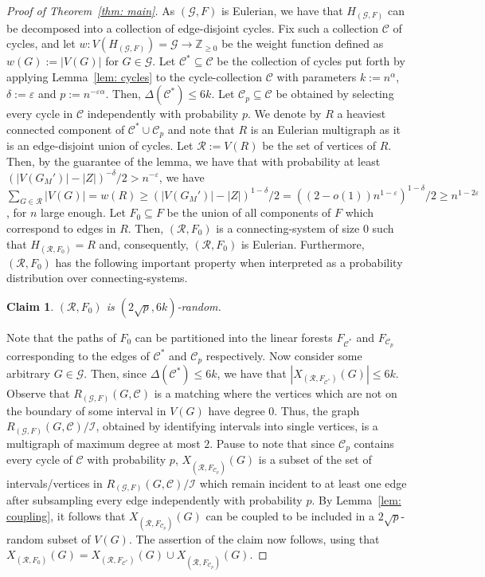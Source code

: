\documentclass[11pt,reqno]{article}
\newtheorem{claim}[theorem]{Claim}
\newenvironment{claimproof}[1][\proofname]{\proof[#1]\renewcommand{\qedsymbol}{$\blacksquare$}}{\endproof}
\begin{document}
\begin{proof}[Proof of Theorem~\ref{thm: main}]
  As $(\mathcal G,F)$ is Eulerian, we have that $H_{(\mathcal G,F)}$  can be decomposed into a collection of edge-disjoint cycles. Fix such a collection $\mathcal C$ of cycles, and let $w:V(H_{(\mathcal G,F)})=\mathcal{G}\rightarrow \mathbb{Z}_{\ge 0}$ be the weight function defined as $w(G):=|V(G)|$ for $G\in\mathcal G$. Let $\mathcal C^*\subseteq \mathcal C$ be the collection of cycles put forth by applying Lemma~\ref{lem: cycles} to the cycle-collection $\mathcal{C}$ with parameters $k:=n^{\alpha}$, $\delta:=\varepsilon$ and $p:=n^{-\varepsilon\alpha}$. Then, $\Delta(\mathcal C^\ast)\le 6k$. Let $\mathcal C_p\subseteq \mathcal C$ be obtained by selecting every cycle in $\mathcal C$ independently with probability $p$. We denote by $R$ a heaviest connected component of $\mathcal C^*\cup \mathcal C_p$ and note that $R$ is an Eulerian multigraph as it is an edge-disjoint union of cycles. Let $\mathcal R:=V(R)$ be the set of vertices of $R$. Then, by the guarantee of the lemma, we have that with probability at least $(|V(G_M')|-|Z|)^{-\delta}/2>n^{-\varepsilon}$, we have $\sum_{G\in \mathcal{R}}|V(G)|=w(R)\ge (|V(G_M')|-|Z|)^{1-\delta}/2=((2-o(1))n^{1-\varepsilon})^{1-\delta}/2\ge n^{1-2\varepsilon}$, for $n$ large enough. Let $F_0\subseteq F$ be the union of all components of $F$ which correspond to edges in $R$. Then, $(\mathcal R,F_0)$ is a connecting-system of size $0$ such that $H_{(\mathcal R,F_0)}=R$ and, consequently, $(\mathcal R,F_0)$ is Eulerian. Furthermore, $(\mathcal{R},F_0)$ has the following important property when interpreted as a probability distribution over connecting-systems.
  \begin{claim}
      $(\mathcal R,F_0)$ is $(2\sqrt{p},6k)$-random.
  \end{claim}
  \begin{claimproof}
      Note that the paths of $F_0$ can be partitioned into the linear forests $F_{\mathcal C^*}$ and $F_{\mathcal C_p}$ corresponding to the edges of $\mathcal C^*$ and $\mathcal C_p$ respectively. Now consider some arbitrary $G\in \mathcal G$. Then, since $\Delta(\mathcal C^*)\le 6k$, we have that $|X_{(\mathcal R,F_{\mathcal C^*})}(G)|\leq 6k$. Observe that $R_{(\mathcal G,F)}(G,\mathcal C)$ is a matching where the vertices which are not on the boundary of some interval in $V(G)$ have degree $0$. Thus, the graph $R_{(\mathcal G,F)}(G,\mathcal C)\slash \mathcal I$, obtained by identifying intervals into single vertices, is a multigraph of maximum degree at most $2$. Pause to note that since $\mathcal C_p$ contains every cycle of $\mathcal C$ with probability $p$, $X_{(\mathcal R,F_{\mathcal C_p})}(G)$ is a subset of the set of intervals/vertices in $R_{(\mathcal G, F)}(G,\mathcal C)\slash \mathcal I$ which remain incident to at least one edge after subsampling every edge independently with probability $p$. By Lemma~\ref{lem: coupling}, it follows that $X_{(\mathcal R,F_{\mathcal C_p})}(G)$ can be coupled to be included in a $2\sqrt{p}$-random subset of $V(G)$. The assertion of the claim now follows, using that $X_{(\mathcal R, F_0)}(G)=X_{(\mathcal R, F_{\mathcal C^*})}(G)\cup X_{(\mathcal R, F_{\mathcal C_p})}(G)$.

\end{claimproof}
\end{proof}
\end{document}
